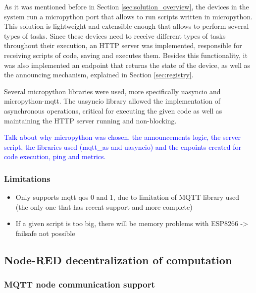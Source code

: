 As it was mentioned before in Section \ref{sec:solution_overview}, the devices in the system run a micropython port that allows to run scripts written in micropython. This solution is lightweight and extensible enough that allows to perform several types of tasks. Since these devices need to receive different types of tasks throughout their execution, an HTTP server was implemented, responsible for receiving scripts of code, saving and executes them. Besides this functionality, it was also implemented an endpoint that returns the state of the device, as well as the announcing mechanism, explained in Section \ref{sec:registry}.

Several micropython libraries were used, more specifically uasyncio and micropython-mqtt. The uasyncio library allowed the implementation of asynchronous operations, critical for executing the given code as well as maintaining the HTTP server running and non-blocking.


\textcolor{blue}{Talk about why micropython was chosen, the announcements logic, the server script, the libraries used (mqtt\_as and uasyncio) and the enpoints created for code execution, ping and metrics.}

\subsubsection{Limitations}

\begin{itemize}
    \item Only supports mqtt qos 0 and 1, due to limitation of MQTT library used (the only one that has recent support and more complete)
    \item If a given script is too big, there will be memory problems with ESP8266 -> failsafe not possible
\end{itemize}

\subsection{Node-RED decentralization of computation}\label{sec:node_red_decentralization}

\subsubsection{MQTT node communication support}\label{sec:mqtt_support}

